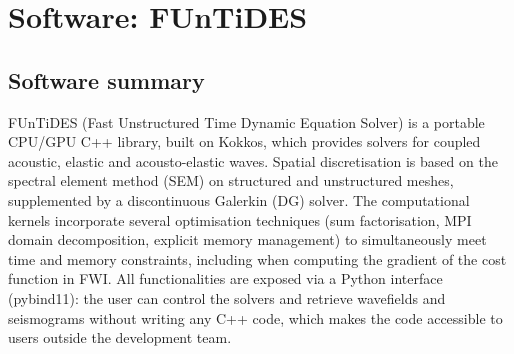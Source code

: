 
\section{Software: FUnTiDES}
\label{sec:FUnTiDES:software}

%

\label{sec:FUnTiDES:metadata}


\subsection{Software summary}
\label{sec:FUnTiDES:summary}

FUnTiDES (Fast Unstructured Time Dynamic Equation Solver) is a portable CPU/GPU C++ library, built on Kokkos, which provides solvers for coupled acoustic, elastic and acousto-elastic waves. Spatial discretisation is based on the spectral element method (SEM) on structured and unstructured meshes, supplemented by a discontinuous Galerkin (DG) solver. The computational kernels incorporate several optimisation techniques (sum factorisation, MPI domain decomposition, explicit memory management) to simultaneously meet time and memory constraints, including when computing the gradient of the cost function in FWI. All functionalities are exposed via a Python interface (pybind11): the user can control the solvers and retrieve wavefields and seismograms without writing any C++ code, which makes the code accessible to users outside the development team.

